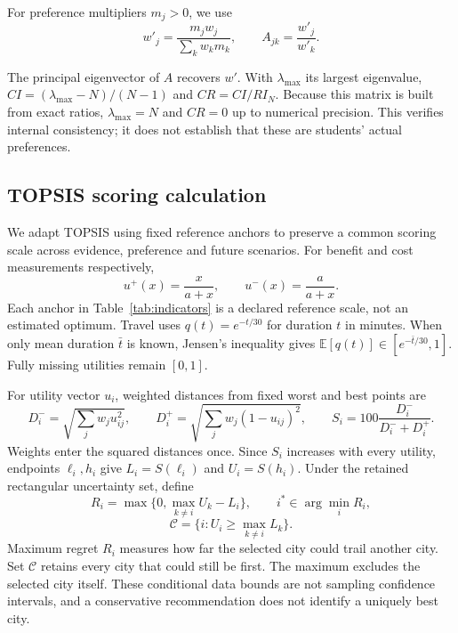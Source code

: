 For preference multipliers $m_j>0$, we use
\begin{equation}
 w'_j=\frac{m_jw_j}{\sum_kw_km_k},\qquad A_{jk}=\frac{w'_j}{w'_k}.
 \label{eq:weights}
\end{equation}
\begin{samepage}
The principal eigenvector of $A$ recovers $w'$. With $\lambda_{\max}$ its
largest eigenvalue, $CI=(\lambda_{\max}-N)/(N-1)$ and $CR=CI/RI_N$.
Because this matrix is built from exact ratios, $\lambda_{\max}=N$ and
$CR=0$ up to numerical precision. This verifies internal consistency;
it does not establish that these are students' actual preferences.
\par\end{samepage}

\subsection{TOPSIS scoring calculation}
We adapt TOPSIS \cite{topsis} using fixed reference anchors to preserve a common scoring scale across evidence,
preference and future scenarios. For benefit and cost measurements respectively,
\begin{equation}
 u^{+}(x)=\frac{x}{a+x},\qquad u^{-}(x)=\frac{a}{a+x}.
\end{equation}
Each anchor in Table~\ref{tab:indicators} is a declared reference scale, not
an estimated optimum. Travel uses $q(t)=e^{-t/30}$ for duration $t$ in minutes.
When only mean duration $\bar t$ is known, Jensen's inequality gives
$\mathbb E[q(t)]\in[e^{-\bar t/30},1]$. Fully missing utilities remain $[0,1]$.

For utility vector $u_i$, weighted distances from fixed worst and best points are
\begin{equation}
 D_i^-=\sqrt{\sum_jw_ju_{ij}^2},\qquad
 D_i^+=\sqrt{\sum_jw_j(1-u_{ij})^2},\qquad
 S_i=100\frac{D_i^-}{D_i^-+D_i^+}.
\end{equation}
Weights enter the squared distances once. Since $S_i$ increases with every
utility, endpoints $\ell_i,h_i$ give $L_i=S(\ell_i)$ and $U_i=S(h_i)$.
Under the retained rectangular uncertainty set, define
\begin{equation}
 R_i=\max\{0,\max_{k\ne i}U_k-L_i\},\qquad
 i^*\in\arg\min_iR_i,
 \label{eq:regret}
\end{equation}
\begin{equation}
 \mathcal C=\{i:U_i\geq\max_{k\ne i}L_k\}.
\end{equation}
Maximum regret $R_i$ measures how far the selected city could trail another
city. Set $\mathcal C$ retains every city that could still be first.
The maximum excludes the selected city itself. These conditional data bounds
are not sampling confidence intervals, and a conservative recommendation does
not identify a uniquely best city.

